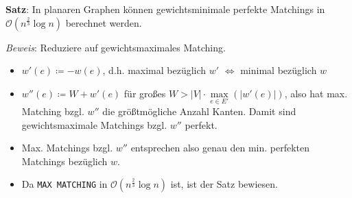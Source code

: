 \textbf{Satz}: In planaren Graphen können gewichtsminimale perfekte Matchings in $\mathcal{O}(n^\frac{2}{3}\log n)$ berechnet werden.

\textit{Beweis}: Reduziere auf gewichtsmaximales Matching.
\begin{itemize}
	\item $w'(e)\coloneqq -w(e)$, d.h. maximal bezüglich $w'$ $\iff$ minimal bezüglich $w$
	\item $w''(e)\coloneqq W+w'(e)$ für großes $W>|V|\cdot\max\limits_{e\in E'} (|w'(e)|)$, also hat max. Matching bzgl. $w''$ die größtmögliche Anzahl Kanten. Damit sind gewichtsmaximale Matchings bzgl. $w''$ perfekt.
	\item Max. Matchings bzgl. $w''$ entsprechen also genau den min. perfekten Matchings bezüglich $w$.
	\item Da \texttt{MAX MATCHING} in $\mathcal{O}(n^\frac{2}{3}\log n)$ ist, ist der Satz bewiesen.
\end{itemize}
\bigskip

